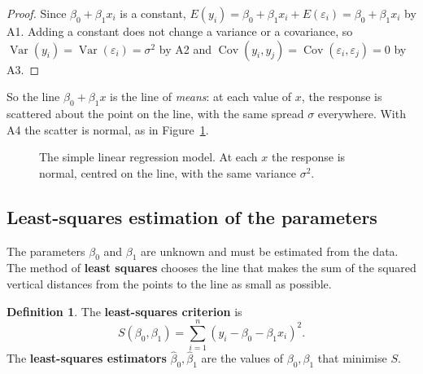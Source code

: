 \documentclass[11pt,a4paper]{article}
\numberwithin{equation}{section}
\theoremstyle{definition}
\newtheorem{defn}[thm]{Definition}
\begin{document}
\begin{proof}
Since $\beta_0 + \beta_1 x_i$ is a constant,
$E(y_i) = \beta_0 + \beta_1 x_i + E(\varepsilon_i) = \beta_0 + \beta_1 x_i$ by A1. Adding a
constant does not change a variance or a covariance, so
$\operatorname{Var}(y_i) = \operatorname{Var}(\varepsilon_i) = \sigma^2$ by A2 and
$\operatorname{Cov}(y_i,y_j) = \operatorname{Cov}(\varepsilon_i,\varepsilon_j) = 0$ by A3.
\end{proof}

So the line $\beta_0 + \beta_1 x$ is the line of \emph{means}: at each value of $x$, the
response is scattered about the point on the line, with the same spread $\sigma$ everywhere.
With A4 the scatter is normal, as in Figure~\ref{fig:slr-assumptions}.

\begin{figure}[H]
\centering
{}
\caption{The simple linear regression model. At each $x$ the response is normal, centred
on the line, with the same variance $\sigma^2$.}
\label{fig:slr-assumptions}
\end{figure}

\subsection{Least-squares estimation of the parameters}
The parameters $\beta_0$ and $\beta_1$ are unknown and must be estimated from the data. The
method of \textbf{least squares} chooses the line that makes the sum of the squared
vertical distances from the points to the line as small as possible.

\begin{defn}
The \textbf{least-squares criterion} is
\[
S(\beta_0, \beta_1) = \sum_{i=1}^n \left( y_i - \beta_0 - \beta_1 x_i \right)^2 .
\]
The \textbf{least-squares estimators} $\hat\beta_0, \hat\beta_1$ are the values of
$\beta_0, \beta_1$ that minimise $S$.
\end{defn}
\end{document}
